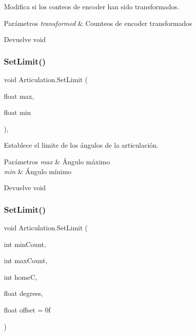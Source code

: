 Modifica si los conteos de encoder han sido transformados. 
\begin{DoxyParams}{Parámetros}
{\em transformed} & Counteos de encoder transformados \\
\hline
\end{DoxyParams}
\begin{DoxyReturn}{Devuelve}
void 
\end{DoxyReturn}
\mbox{\label{class_articulation_ac3ed162898a61f33eb8b9e74c9e46389}} 
\subsubsection{\texorpdfstring{SetLimit()}{SetLimit()}\hspace{0.1cm}{\footnotesize\ttfamily [1/2]}}
{\footnotesize\ttfamily void Articulation.\+Set\+Limit (\begin{DoxyParamCaption}\item[{float}]{max,  }\item[{float}]{min }\end{DoxyParamCaption})\hspace{0.3cm}{\ttfamily [inline]}, {\ttfamily [private]}}

Establece el limite de los ángulos de la articulación. 
\begin{DoxyParams}{Parámetros}
{\em max} & Ángulo máximo \\
\hline
{\em min} & Ángulo mínimo \\
\hline
\end{DoxyParams}
\begin{DoxyReturn}{Devuelve}
void 
\end{DoxyReturn}
\mbox{\label{class_articulation_ab720697712b16b9ed195dd4ba34a01d4}} 
\subsubsection{\texorpdfstring{SetLimit()}{SetLimit()}\hspace{0.1cm}{\footnotesize\ttfamily [2/2]}}
{\footnotesize\ttfamily void Articulation.\+Set\+Limit (\begin{DoxyParamCaption}\item[{int}]{min\+Count,  }\item[{int}]{max\+Count,  }\item[{int}]{homeC,  }\item[{float}]{degrees,  }\item[{float}]{offset = {\ttfamily 0f} }\end{DoxyParamCaption})\hspace{0.3cm}{\ttfamily [inline]}}

